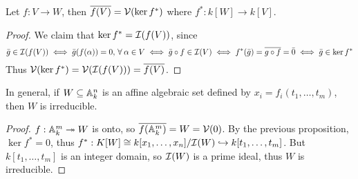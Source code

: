 \begin{prop}
  Let $f : V \to W$, then $\overline{f(V)} = \mathcal{V}(\ker f^*)$ where $f^* : k[W] \to k[V]$.
  \begin{proof}
    We claim that $\ker f^* = \mathcal{I}(f(V))$, since
    \[ \bar{g} \in \Ic(f(V)) \iff \bar{g}(f(\alpha)) = 0, \, \forall \alpha \in V
      \iff \bar{g} \circ f \in \Ic(V)
      \iff f^*(\bar{g}) = \overline{g \circ f} = \bar{0}
      \iff \bar{g} \in \ker f^* \]
    Thus $\mathcal{V}(\ker f^*) = \mathcal{V}(\mathcal{I}(f(V))) = \overline{f(V)}$.
  \end{proof}
\end{prop}

\begin{remark}
  In general, if $W \subseteq \mathbb{A}_k^n$ is an affine algebraic set defined by
  $x_i = f_i(t_1, \dots, t_m)$, then $W$ is irreducible.
  \begin{proof}
    $f : \mathbb{A}^m_k \twoheadrightarrow W$ is onto, so $\overline{f(\mathbb{A}^m_k)}
    = W = \mathcal{V}(0)$. By the previous proposition, $\ker f^* = 0$,
    thus $f^* : K[W] \cong k[x_1, \dots, x_n] / \mathcal{I}(W) \hookrightarrow k[t_1, \dots, t_m]$.
    But $k[t_1, \dots, t_m]$ is an integer domain, so $\mathcal{I}(W)$ is a prime ideal,
    thus $W$ is irreducible.
  \end{proof}
\end{remark}

